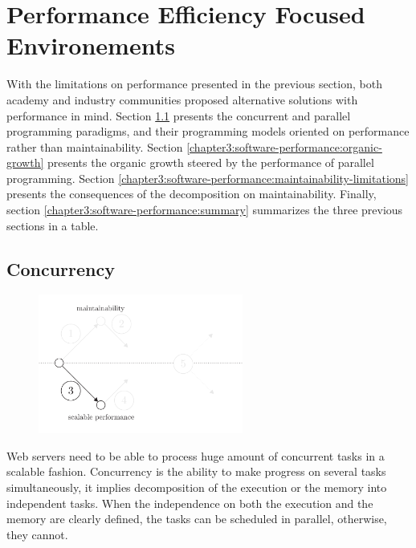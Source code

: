 \section{Performance Efficiency Focused Environements} \label{chapter3:software-performance}

With the limitations on performance presented in the previous section, both academy and industry communities proposed alternative solutions with performance in mind.
Section \ref{chapter3:software-performance:concurrency} presents the concurrent and parallel programming paradigms, and their programming models oriented on performance rather than maintainability.
Section \ref{chapter3:software-performance:organic-growth} presents the organic growth steered by the performance of parallel programming.
Section \ref{chapter3:software-performance:maintainability-limitations} presents the consequences of the decomposition on maintainability.
Finally, section \ref{chapter3:software-performance:summary} summarizes the three previous sections in a table.

\subsection{Concurrency} \label{chapter3:software-performance:concurrency}

\begin{figure}[h!]  \label{fig:state-of-the-art-3}
\begin{center}
\includegraphics[width=0.6\textwidth]{../ressources/state-of-the-art-3.pdf}
\end{center}
\end{figure}

Web servers need to be able to process huge amount of concurrent tasks in a scalable fashion.
Concurrency is the ability to make progress on several tasks simultaneously, it implies decomposition of the execution or the memory into independent tasks.
When the independence on both the execution and the memory are clearly defined, the tasks can be scheduled in parallel, otherwise, they cannot.

